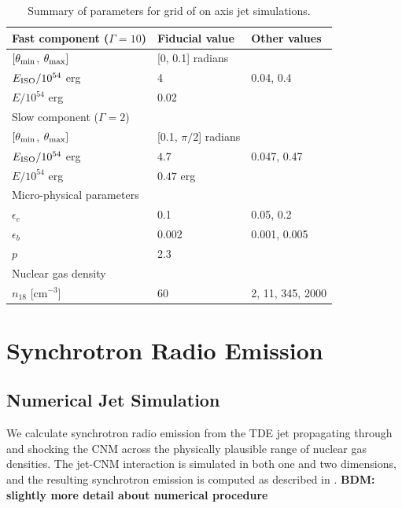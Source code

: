 \documentclass[usenatbib,fleqn]{mnras}
\begin{document}
\begin{table}
\begin{threeparttable}
  \caption{\label{tab:jetParams} Summary of parameters for grid of on
    axis jet simulations.}
  \begin{tabular*}{0.95\columnwidth}{lll}
    Fast component ($\Gamma=10$) & Fiducial value & Other values \\ 
    \hline
    $[\theta_{\rm min}$, $\theta_{\rm max}]$ & [0, 0.1] radians & \\
    $E_{\rm ISO}/10^{54}$ erg & 4  & 0.04, 0.4\\
    $E/10^{54}$ erg & 0.02 & \\
    \hline 
    Slow component ($\Gamma=2$)\\
    $[\theta_{\rm min}$, $\theta_{\rm max}]$ & [0.1, $\pi/2$] radians
    & \\
    $E_{\rm ISO}/10^{54}$ erg & $4.7$ & 0.047, 0.47 \\
    $E/10^{54}$  erg & $0.47$ erg & \\
    \hline
    Micro-physical parameters\\
    $\epsilon_e$ & 0.1 &  0.05, 0.2\\
    $\epsilon_b$ & 0.002 & 0.001, 0.005\\
    $p$ & 2.3\\
    \hline 
    Nuclear gas density \\
    $n_{18}$ [cm$^{-3}$] & 60 & 2, 11, 345, 2000
  \end{tabular*}
\end{threeparttable}
\end{table}


\section{Synchrotron Radio Emission}

\label{sec:results}
\subsection{Numerical Jet Simulation}
\label{sec:numerical}
We calculate synchrotron radio emission from the TDE jet propagating
through and shocking the CNM across the physically plausible range of
nuclear gas densities.  The jet-CNM interaction is simulated in both
one and two dimensions, and the resulting synchrotron emission is
computed as described in \citet{Mimica+2015}.  {\bf BDM: slightly more
  detail about numerical procedure}
\end{document}
